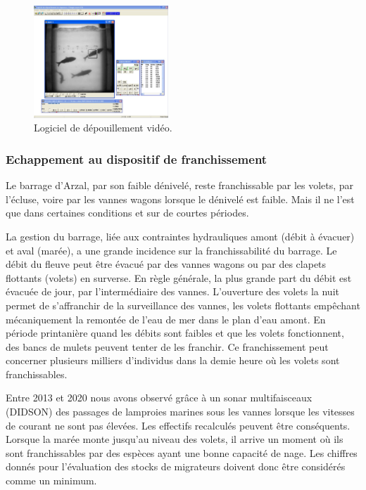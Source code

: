 \documentclass[11pt,twocolumn,titlepage,twoside]{article}\usepackage[]{graphicx}\usepackage[]{color}
\begin{document}
\begin{figure}[htpb]
\centering
\includegraphics[width=0.45\textwidth]{wpois32.png}
\caption{Logiciel de dépouillement vidéo.
}
\label{image:wpois32}
\end{figure}

\subsubsection{Echappement au dispositif de franchissement}

Le barrage d’Arzal, par son faible dénivelé, reste franchissable par les volets,
par l’écluse, voire par les vannes wagons lorsque le dénivelé est faible. Mais
il ne l’est que dans certaines conditions et sur de courtes périodes.

La gestion du barrage, liée aux contraintes hydrauliques amont (débit à évacuer) et aval (marée), 
a une grande incidence sur la franchissabilité du barrage.
Le débit du fleuve peut être évacué par des vannes wagons ou
par des clapets flottants (volets) en surverse.
En règle générale, la plus grande part du débit est évacuée de jour, par l’intermédiaire des vannes. 
L’ouverture des volets la nuit permet de s’affranchir de la surveillance des vannes, 
les volets flottants empêchant mécaniquement la remontée de l’eau de mer dans le
plan d’eau amont. En période printanière quand les débits sont faibles et que
les volets fonctionnent, des bancs de mulets peuvent tenter de les franchir. Ce
franchissement peut concerner plusieurs milliers d'individus dans la demie heure
où les volets sont franchissables.

Entre 2013 et 2020 nous avons observé grâce à un sonar multifaisceaux (DIDSON)
des passages de lamproies marines sous les vannes lorsque les vitesses de courant ne sont pas élevées. Les effectifs recalculés peuvent être conséquents.
Lorsque la marée monte jusqu’au niveau des volets, il arrive un moment où ils sont franchissables par des espèces
ayant une bonne capacité de nage. Les chiffres donnés pour
l’évaluation des stocks de migrateurs doivent donc être considérés comme un minimum.
\end{document}
